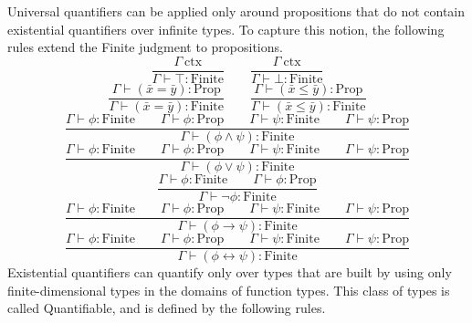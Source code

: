 \documentclass[11pt]{article}
\begin{document}
Universal quantifiers can be applied only around propositions
that do not contain existential quantifiers over infinite
types. To capture this notion, the following rules extend
the Finite judgment to propositions.
\begin{equation}
	\frac{\Gamma\ \text{ctx}}
	{\Gamma \vdash \top : \text{Finite}}
	\qquad
	\frac{\Gamma\ \text{ctx}}
	{\Gamma \vdash \bot : \text{Finite}}
\end{equation}
\begin{equation}
	\frac{\Gamma \vdash (\bar{x} = \bar{y}) : \text{Prop}}
	{\Gamma \vdash (\bar{x} = \bar{y}) : \text{Finite}}
	\qquad
	\frac{\Gamma \vdash (\bar{x} \leq \bar{y}) : \text{Prop}}
	{\Gamma \vdash (\bar{x} \leq \bar{y}) : \text{Finite}}
\end{equation}
\begin{equation}
	\frac{\Gamma \vdash \phi : \text{Finite}
	\qquad \Gamma \vdash \phi : \text{Prop}
	\qquad \Gamma \vdash \psi : \text{Finite}
	\qquad \Gamma \vdash \psi : \text{Prop}}
	{\Gamma \vdash (\phi \wedge \psi) : \text{Finite}}
\end{equation}
\begin{equation}
	\frac{\Gamma \vdash \phi : \text{Finite}
	\qquad \Gamma \vdash \phi : \text{Prop}
	\qquad \Gamma \vdash \psi : \text{Finite}
	\qquad \Gamma \vdash \psi : \text{Prop}}
	{\Gamma \vdash (\phi \vee \psi) : \text{Finite}}
\end{equation}
\begin{equation}
	\frac{\Gamma \vdash \phi : \text{Finite}
	\qquad \Gamma \vdash \phi : \text{Prop}}
	{\Gamma \vdash \neg\phi : \text{Finite}}
\end{equation}
\begin{equation}
	\frac{\Gamma \vdash \phi : \text{Finite}
	\qquad \Gamma \vdash \phi : \text{Prop}
	\qquad \Gamma \vdash \psi : \text{Finite}
	\qquad \Gamma \vdash \psi : \text{Prop}}
	{\Gamma \vdash (\phi \to \psi) : \text{Finite}}
\end{equation}
\begin{equation}
	\frac{\Gamma \vdash \phi : \text{Finite}
	\qquad \Gamma \vdash \phi : \text{Prop}
	\qquad \Gamma \vdash \psi : \text{Finite}
	\qquad \Gamma \vdash \psi : \text{Prop}}
	{\Gamma \vdash (\phi \leftrightarrow \psi) : \text{Finite}}
\end{equation}
Existential quantifiers can quantify only over types that
are built by using only finite-dimensional types in the domains
of function types. This class of types is called Quantifiable,
and is defined by the following rules.
\end{document}
